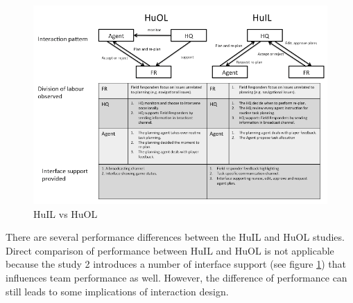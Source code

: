 \begin{figure}[h]
  \centering
  \includegraphics[width=1\textwidth]{img/conclusion/huilvshuol}
  \caption{HuIL vs HuOL}
  \label{fig:huilvshuol}
\end{figure}


There are several performance differences between the HuIL and HuOL studies. Direct comparison of performance between HuIL and HuOL is not applicable because the study 2 introduces a number of interface support (see figure \ref{fig:huilvshuol}) that influences team performance as well. However, the difference of performance can still leads to some implications of interaction design.\\

